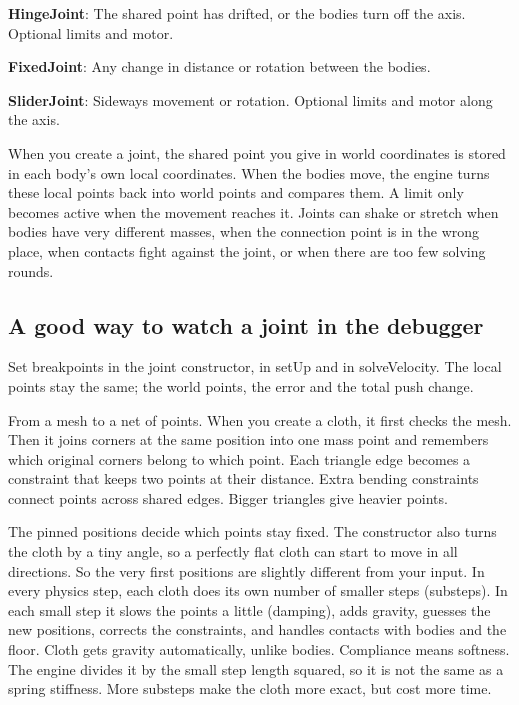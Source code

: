 \documentclass[11pt,a4paper]{article}
\begin{document}
\textbf{HingeJoint}: The shared point has drifted, or the bodies turn off the axis. Optional limits and motor.

\textbf{FixedJoint}: Any change in distance or rotation between the bodies.

\textbf{SliderJoint}: Sideways movement or rotation. Optional limits and motor along the axis.

When you create a joint, the shared point you give in world coordinates is stored in each body's own local coordinates. When the bodies move, the engine turns these local points back into world points and compares them. A limit only becomes active when the movement reaches it. Joints can shake or stretch when bodies have very different masses, when the connection point is in the wrong place, when contacts fight against the joint, or when there are too few solving rounds.

\subsection*{A good way to watch a joint in the debugger}
Set breakpoints in the joint constructor, in setUp and in solveVelocity. The local points stay the same; the world points, the error and the total push change.

\label{vpe-core-17}
From a mesh to a net of points. When you create a cloth, it first checks the mesh. Then it joins corners at the same position into one mass point and remembers which original corners belong to which point. Each triangle edge becomes a constraint that keeps two points at their distance. Extra bending constraints connect points across shared edges. Bigger triangles give heavier points.

\begin{center}\end{center}

The pinned positions decide which points stay fixed. The constructor also turns the cloth by a tiny angle, so a perfectly flat cloth can start to move in all directions. So the very first positions are slightly different from your input. In every physics step, each cloth does its own number of smaller steps (substeps). In each small step it slows the points a little (damping), adds gravity, guesses the new positions, corrects the constraints, and handles contacts with bodies and the floor. Cloth gets gravity automatically, unlike bodies. Compliance means softness. The engine divides it by the small step length squared, so it is not the same as a spring stiffness. More substeps make the cloth more exact, but cost more time.
\end{document}

